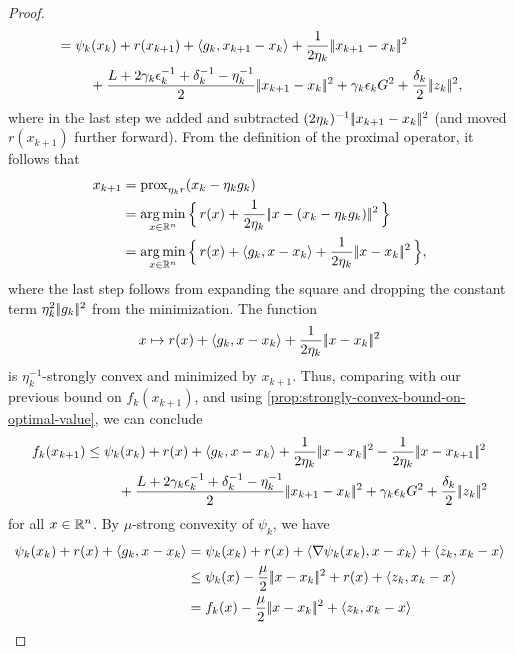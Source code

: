 \begin{proof}
\begin{align*}
        &= \psi_k(x_k) + r(x_{k+1}) + \langle g_k, x_{k+1} - x_k \rangle + \frac{1}{2\eta_k}|\!|x_{k+1} - x_k|\!|^2 \\
        &\phantom{===} + \frac{L + 2\gamma_k\epsilon_k^{-1} + \delta_k^{-1} - \eta_k^{-1}}{2} |\!|x_{k+1} - x_k|\!|^2 + \gamma_k \epsilon_k G^2 + \frac{\delta_k}{2} |\!|z_k|\!|^2,
    \end{align*}
    where in the last step we added and subtracted $(2\eta_k)^{-1} |\!|x_{k+1} - x_k|\!|^2$ (and moved $r(x_{k+1})$
    further forward).
    From the definition of the proximal operator, it follows that
    \begin{align*}
        x_{k+1} &= \operatorname{prox}_{\eta_k r} (x_k - \eta_k g_k) \\
                &= \operatorname*{arg\,min}_{x\in\mathbb{R}^n} \Big\{\, r(x) + \frac{1}{2\eta_k}|\!|x - (x_k - \eta_k g_k)|\!|^2 \,\Big\} \\
                &= \operatorname*{arg\,min}_{x\in\mathbb{R}^n} \Big\{\, r(x) + \langle g_k, x - x_k \rangle + \frac{1}{2\eta_k}|\!|x - x_k|\!|^2 \,\Big\},
    \end{align*}
    where the last step follows from expanding the square and dropping
    the constant term $\eta_k^2 |\!|g_k|\!|^2$ from the minimization.
    The function
    \[
        x\mapsto r(x) + \langle g_k, x - x_k \rangle + \frac{1}{2\eta_k}|\!|x - x_k|\!|^2
    \]
    is $\eta_k^{-1}$-strongly convex and minimized by $x_{k+1}$. Thus,
    comparing with our previous bound on $f_k(x_{k+1})$, and using \cref{prop:strongly-convex-bound-on-optimal-value},
    we can conclude
    \begin{align*}
        f_k(x_{k+1})
        &\leq \psi_k(x_k) + r(x) + \langle g_k, x - x_k \rangle + \frac{1}{2\eta_k}\norm{x - x_k}^2
            - \frac{1}{2\eta_k}\norm{x - x_{k+1}}^2 \\
        &\phantom{===} + \frac{L + 2\gamma_k\epsilon_k^{-1} + \delta_k^{-1} - \eta_k^{-1}}{2} \norm{x_{k+1} - x_k}^2
            + \gamma_k \epsilon_k G^2 + \frac{\delta_k}{2} \norm{z_k}^2
    \end{align*}
    for all $x\in\mathbb{R}^n$. By $\mu$-strong convexity of $\psi_k$, we have
    \begin{align*}
        \psi_k(x_k) + r(x) + \langle g_k, x - x_k \rangle
        &=
        \psi_k(x_k) + r(x) + \langle \nabla \psi_k(x_k), x - x_k \rangle + \langle z_k, x_k - x \rangle \\
        &\leq
        \psi_k(x) - \frac{\mu}{2}\norm{x - x_k}^2 + r(x) + \langle z_k, x_k - x \rangle \\
        &=
        f_k(x) - \frac{\mu}{2}\norm{x - x_k}^2 + \langle z_k, x_k - x \rangle

\end{align*}
\end{proof}
